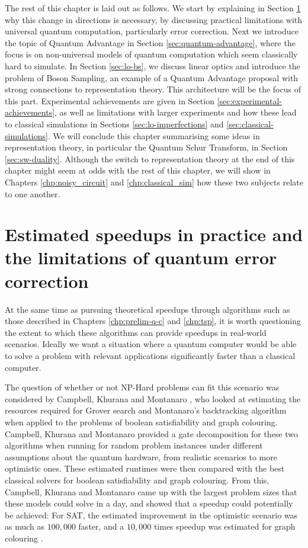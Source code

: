 The rest of this chapter is laid out as follows. We start by explaining in Section \ref{sec:error-correction} why this change in directions is necessary, by discussing practical limitations with universal quantum computation, particularly error correction. Next we introduce the topic of Quantum Advantage in Section \ref{sec:quantum-advantage}, where the focus is on non-universal models of quantum computation which seem classically hard to simulate. In Section \ref{sec:lo-bs}, we discuss linear optics and introduce the problem of Boson Sampling, an example of a Quantum Advantage proposal with strong connections to representation theory. This architecture will be the focus of this part. Experimental achievements are given in Section \ref{sec:experimental-achievements}, as well as limitations with larger experiments and how these lead to classical simulations in Sections \ref{sec:lo-imperfections} and \ref{sec:classical-simulations}. We will conclude this chapter summarising some ideas in representation theory, in particular the Quantum Schur Transform, in Section \ref{sec:sw-duality}. Although the switch to representation theory at the end of this chapter might seem at odds with the rest of this chapter, we will show in Chapters \ref{chp:noisy_circuit} and \ref{chp:classical_sim} how these two subjects relate to one another.

\section{Estimated speedups in practice and the limitations of quantum error correction}
\label{sec:error-correction}

At the same time as pursuing theoretical speedups through algorithms such as those described in Chapters \ref{chp:prelim-q-c} and \ref{chp:tsp}, it is worth questioning the extent to which these algorithms can provide speedups in real-world scenarios. Ideally we want a situation where a quantum computer would be able to solve a problem with relevant applications significantly faster than a classical computer.

The question of whether or not NP-Hard problems can fit this scenario was considered by Campbell, Khurana and Montanaro \cite{campbell2019}, who looked at estimating the resources required for Grover search and Montanaro's backtracking algorithm when applied to the problems of boolean satisfiability and graph colouring. Campbell, Khurana and Montanaro provided a gate decomposition for these two algorithms when running for random problem instances under different assumptions about the quantum hardware, from realistic scenarios to more optimistic ones. These estimated runtimes were then compared with the best classical solvers for boolean satisfiability and graph colouring. From this, Campbell, Khurana and Montanaro came up with the largest problem sizes that these models could solve in a day, and showed that a speedup could potentially be achieved: For SAT, the estimated improvement in the optimistic scenario was as much as $100,000$ faster, and a $10,000$ times speedup was estimated for graph colouring \cite{campbell2019}.

